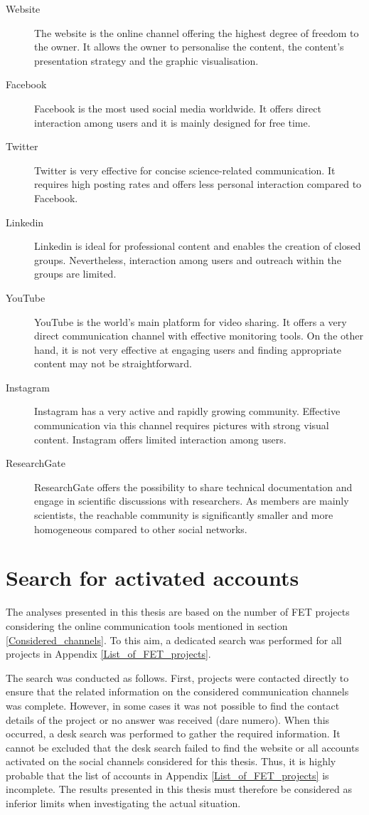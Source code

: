 \begin{description}
 \item [Website] The website is the online channel offering the highest degree of freedom to the owner. It allows the owner to personalise the content, the content's presentation strategy and the graphic visualisation.
 \item [Facebook] Facebook is the most used social media worldwide. It offers direct interaction among users and it is mainly designed for free time.  
 \item [Twitter] Twitter is very effective for concise science-related communication. It requires high posting rates and offers less personal interaction compared to Facebook.
 \item [Linkedin] Linkedin is ideal for professional content and enables the creation of closed groups. Nevertheless, interaction among users and outreach within the groups are limited.
 \item [YouTube] YouTube is the world's main platform for video sharing. It offers a very direct communication channel with effective monitoring tools. On the other hand, it is not very effective at engaging users and finding appropriate content may not be straightforward.
 \item [Instagram] Instagram has a very active and rapidly growing community. Effective communication via this channel requires pictures with strong visual content. Instagram offers limited interaction among users.
 \item [ResearchGate] ResearchGate offers the possibility to share technical documentation and engage in scientific discussions with researchers. As members are mainly scientists, the reachable community is significantly smaller and more homogeneous compared to other social networks.  
\end{description}

\section{Search for activated accounts}
The analyses presented in this thesis are based on the number of FET projects considering the online communication tools mentioned in section \ref{Considered_channels}. To this aim, a dedicated search was performed for all projects in Appendix \ref{List_of_FET_projects}. 

The search was conducted as follows. First, projects were contacted directly to ensure that the related information on the considered communication channels was complete. However, in some cases it was not possible to find the contact details of the project or no answer was received (dare numero). When this occurred, a desk search was performed to gather the required information. It cannot be excluded that the desk search failed to find the website or all accounts activated on the social channels considered for this thesis. Thus, it is highly probable that the list of accounts in Appendix \ref{List_of_FET_projects} is incomplete. The results presented in this thesis must therefore be considered as inferior limits when investigating the actual situation. 

